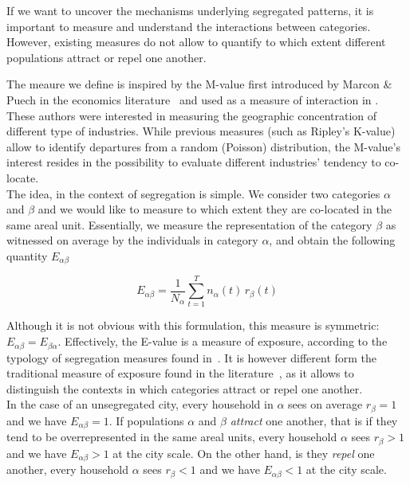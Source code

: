 If we want to uncover the mechanisms underlying segregated patterns, it is
important to measure and understand the interactions between categories.
However, existing measures do not allow to quantify to which extent different populations
attract or repel one another. 

The meaure we define is inspired by the M-value first introduced by Marcon \&
Puech in the economics literature~\cite{Marcon:2009} and used as a measure of
interaction in \cite{Jensen:2006}.  These authors were interested in measuring
the geographic concentration of different type of  industries. While previous
measures (such as Ripley's K-value) allow to identify departures from a random
(Poisson) distribution, the M-value's interest resides in the possibility to
evaluate different industries' tendency to co-locate.\\

The idea, in the context of segregation is simple. We consider two categories
$\alpha$ and $\beta$ and we would like to measure to which extent they are
co-located in the same areal unit. Essentially, we measure the representation of
the category $\beta$ as witnessed on average by the individuals in category
$\alpha$, and obtain the following quantity $E_{\alpha\beta}$

\begin{equation} 
    E_{\alpha \beta} = \frac{1}{N_\alpha} \sum_{t=1}^{T} n_\alpha(t)\,r_\beta(t) 
\end{equation}

Although it is not obvious with this formulation, this measure is symmetric:
$E_{\alpha \beta} = E_{\beta \alpha}$. Effectively, the E-value is a measure of exposure,
according to the typology of segregation measures found in~\cite{Massey:1988}.
It is however different form the traditional measure of exposure found in the
literature~\cite{Bell:1954}, as it allows to distinguish the contexts in
which categories attract or repel one another.\\

In the case of an unsegregated city, every household in $\alpha$ sees
on average $r_\beta = 1$ and we have $E_{\alpha \beta} = 1$. 
If populations $\alpha$ and $\beta$ {\em attract} one another, that is if they
tend to be overrepresented in the same areal units, every household $\alpha$
sees $r_\beta > 1$ and we have $E_{\alpha \beta} > 1$ at the city scale. 
On the other hand, is they
{\em repel} one another, every household $\alpha$ sees $r_\beta < 1$
and we have $E_{\alpha \beta} <1$ at the city scale. 


